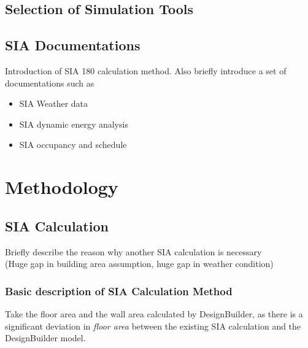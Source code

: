 \documentclass[11pt, a4paper]{article}
\theoremstyle{definition}
\begin{document}
			


			




	

	\subsection{Selection of Simulation Tools}
		\begin{comment}
		\begin{itemize}
			\item Discuss the existing result of the previous study. 
			\item A significant performance gap is observed. Possible causes of the performance gap.
			\item The data and measurement of previous studies.
			\item Other scientific journals that involve the topic performance gap
		\end{itemize}
		\end{comment}

		
	\subsection{SIA Documentations}
		Introduction of SIA 180 calculation method. Also briefly introduce a set of documentations such as 
		\begin{itemize}
			\item SIA Weather data
			\item SIA dynamic energy analysis
			\item SIA occupancy and schedule
		\end{itemize}
		


		 


\section{Methodology}

	\subsection{SIA Calculation}
		Briefly describe the reason why another SIA calculation is necessary\\
		(Huge gap in building area assumption, huge gap in weather condition)


		\subsubsection{Basic description of SIA Calculation Method}
			Take the floor area and the wall area calculated by DesignBuilder, as there is a significant deviation in \textit{floor area} between the existing SIA calculation and the DesignBuilder model.
			
\end{document}
